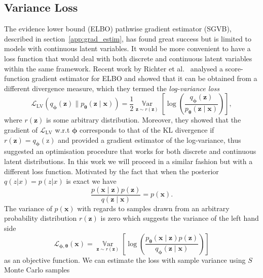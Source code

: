 \subsection{Variance Loss}
The evidence lower bound (ELBO) pathwise gradient estimator (SGVB), described in section~\ref{app:grad_estim}, has found great success but is limited to models with continuous latent variables. It would be more convenient to have a loss function that would deal with both discrete and continuous latent variables within the same framework. Recent work by Richter et al.~\cite{richter2020vargrad} analysed a score-function gradient estimator for ELBO and showed that it can be obtained from a different divergence measure, which they termed the \emph{log-variance loss}
\begin{equation}
	\mathcal{L}_{\text{LV}}\left(q_{\boldsymbol{\phi}}(\mathbf{z}) \| p_{\boldsymbol{\theta}}(\mathbf{z} \mid \mathbf{x})\right)=\frac{1}{2} \underset{\mathbf{\mathbf{z}} \sim r(\mathbf{\mathbf{z}})}{\operatorname{\mathbb{V}ar}}\left[\log \left(\frac{q_{\boldsymbol{\phi}}(\mathbf{z})}{p_{\boldsymbol{\theta}}(\mathbf{z} \mid \mathbf{x})}\right)\right],
\end{equation}
where $r(\mathbf{z})$ is some arbitrary distribution. Moreover, they showed that the gradient of $\mathcal{L}_{\text{LV}}$ w.r.t $\boldsymbol{\phi}$ corresponds to that of the KL divergence if $r(\mathbf{\mathbf{z}}) = q_{\boldsymbol{\phi}}(\mathrm{z})$ and provided a gradient estimator of the log-variance, thus suggested an optimisation procedure that works for both discrete and continuous latent distributions. In this work we will proceed in a similar fashion but with a different loss function. Motivated by the fact that when the posterior $q(z | x) = p(z | x)$ is exact we have
\begin{equation}
	\frac{p(\mathbf{x} \mid \mathbf{z}) p(\mathbf{z})}{q(\mathbf{z} \mid \mathbf{x})}=p(\mathbf{x}).
\end{equation}
The variance of $p(\mathbf{x})$ with regards to samples drawn from an arbitrary probability distribution $r(\mathbf{z})$ is zero which suggests the variance of the left hand side
\begin{equation}
	\mathcal{L}_{\boldsymbol{\phi}, \boldsymbol{\theta}}(\mathbf{x}) = \underset{\mathbf{z} \sim r(\mathbf{z})}{\operatorname{\mathbb{V}ar}}\left[\log \left(\frac{p_{\boldsymbol{\theta}}(\mathbf{x} \mid \mathbf{z}) p(\mathbf{z})}{q_{\boldsymbol{\phi}}(\mathbf{z} \mid \mathbf{x})}\right)\right]
\end{equation}
as an objective function. We can estimate the loss with sample variance using $S$ Monte Carlo samples
